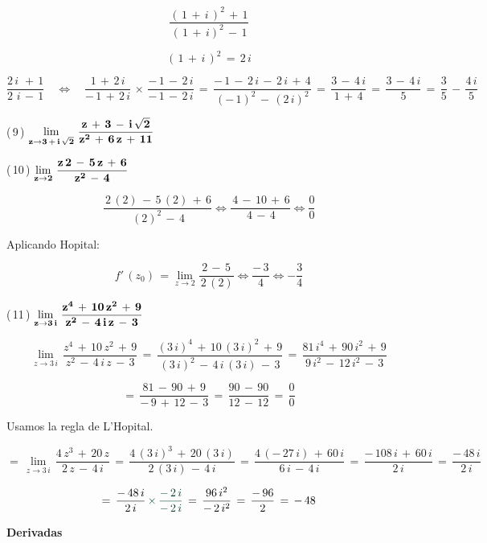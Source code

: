 \documentclass[a4paper,11pt,openany]{book}
\begin{document}
$$\dfrac{(\,1\,+\,i\,)^{2}\,+\,1}{(\,1\,+\,i)^{2}\,-\,1}$$

$$(\,1\,+\,i\,)^{2}\,=\,2\,i$$

$$\dfrac{2\,i\,\,+\,1}{2\,\,i\,-\,1} \quad\iff\quad \dfrac{1\,+\,2\,i}{-\,1\,+\,2\,i}\,\times\,\dfrac{-\,1\,-\,2\,i}{-\,1\,-\,2\,i}\,=\,\dfrac{-\,1\,-\,2\,i\,-\,2\,i\,+\,4}{(-\,1)^{2}\,-\,(2\,i)^{2}}\,=\,\dfrac{3\,-\,4\,i}{1\,+\,4}\,=\,\dfrac{3\,-\,4\,i}{5}\,=\,\boxed{\dfrac{3}{5}\,-\,\dfrac{4\,i}{5}}$$

\textcolor{ao(english)}{(\,9\,)} $\bf{\displaystyle\lim_{z \to 3\,+\,i\,\sqrt{2}}\,\dfrac{z\,+\,3\,-\,i\,\sqrt{2}}{z^{2}\,+\,6\,z\,+\,11}}$

\textcolor{ao(english)}{(\,10\,)} $\bf{\displaystyle\lim_{z \to 2}\,\dfrac{z\,2\,-\,5\,z\,+\,6}{z^{2}\,-\,4}}$

$$ \dfrac{\,2\,(2)\,-\,5\,(2)\,+\,6}{\,(2)^{2}\,-\,4} \iff \dfrac{\,4\,-\,10\,+\,6}{\,4\,-\,4} \iff \dfrac{0}{0}$$

Aplicando Hopital:

$$ f'\,(z_{0})\,= \displaystyle\lim_{z \to 2} \dfrac{\,2\,-\,5\,}{\,2\,(2)} \iff \dfrac{-\,3}{4} \iff \boxed{-\dfrac{3}{4}}$$

\textcolor{ao(english)}{(\,11\,)} $\bf{\displaystyle\lim_{z \to 3\,i}\,\dfrac{z^{4}\,+\,10\,z^{2}\,+\,9}{z^{2}\,-\,4\,i\,z\,-\,3}}$

$$\displaystyle\lim_{z \to 3\,i}\,\dfrac{z^{4}\,+\,10\,z^{2}\,+\,9}{z^{2}\,-\,4\,i\,z\,-\,3}\,=\,\dfrac{(3\,i)^{4}\,+\,10\,(3\,i)^{2}\,+\,9}{(3\,i)^{2}\,-\,4\,i\,(3\,i)\,-\,3}\,=\,\dfrac{81\,i^{4}\,+\,90\,i^{2}\,+\,9}{9\,i^{2}\,-\,12\,i^{2}\,-\,3}$$

$$=\,\dfrac{81\,-\,90\,+\,9}{-\,9\,+\,12\,-\,3}\,=\,\dfrac{90\,-\,90}{12\,-\,12}\,=\,\dfrac{0}{0}$$

\textcolor{ao(english)}{} Usamos la regla de L'Hopital.


$$=\,\displaystyle\lim_{z \to 3\,i}\,\dfrac{4\,z^{3}\,+\,20\,z}{2\,z\,-\,4\,i}\,=\,\dfrac{4\,(3\,i)^{3}\,+\,20\,(3\,i)}{2\,(3\,i)\,-\,4\,i}\,=\,\dfrac{4\,(-\,27\,i)\,+\,60\,i}{6\,i\,-\,4\,i}\,=\,\dfrac{-\,108\,i\,+\,60\,i}{2\,i}\,=\,\dfrac{-\,48\,i}{2\,i}$$

$$=\,\dfrac{-\,48\,i}{2\,i}\,\textcolor{britishracinggreen}{\times\,\dfrac{-\,2\,i}{-\,2\,i}}\,=\,\dfrac{96\,i^{2}}{-\,2\,i^{2}}\,=\,\dfrac{-\,96}{2}\,=\,-\,48$$

\begin{center}
\textbf{Derivadas}
\end{center}
\end{document}
